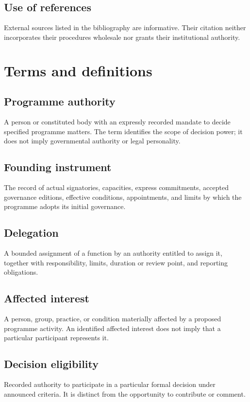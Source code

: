 \documentclass[11pt,a4paper]{article}
\begin{document}
\subsection{Use of references}
External sources listed in the bibliography are informative. Their citation neither incorporates their procedures wholesale nor grants their institutional authority.

\section{Terms and definitions}
\subsection{Programme authority}
A person or constituted body with an expressly recorded mandate to decide specified programme matters. The term identifies the scope of decision power; it does not imply governmental authority or legal personality.

\subsection{Founding instrument}
The record of actual signatories, capacities, express commitments, accepted governance editions, effective conditions, appointments, and limits by which the programme adopts its initial governance.

\subsection{Delegation}
A bounded assignment of a function by an authority entitled to assign it, together with responsibility, limits, duration or review point, and reporting obligations.

\subsection{Affected interest}
A person, group, practice, or condition materially affected by a proposed programme activity. An identified affected interest does not imply that a particular participant represents it.

\subsection{Decision eligibility}
Recorded authority to participate in a particular formal decision under announced criteria. It is distinct from the opportunity to contribute or comment.
\end{document}
